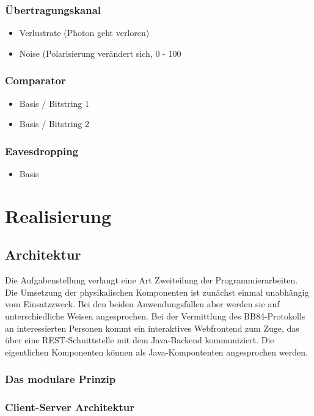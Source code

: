 \documentclass[a4paper,10.2pt,pdftex]{scrartcl}%
\begin{document}
\subsubsection*{ Übertragungskanal}
\begin{itemize}
\item  Verlustrate (Photon geht verloren)
\item  Noise (Polarisierung verändert sich, 0 - 100%
\end{itemize}

\subsubsection*{ Comparator}
\begin{itemize}
\item Basis / Bitstring 1
\item Basis / Bitstring 2
\end{itemize}
\subsubsection*{ Eavesdropping}
\begin{itemize}
\item  Basis
\end{itemize}

\section{Realisierung}
\subsection{Architektur}
Die Aufgabenstellung verlangt eine Art Zweiteilung der Programmierarbeiten. Die Umsetzung der physikalischen Komponenten ist zunächst einmal unabhängig vom Einsatzzweck. Bei den beiden Anwendungsfällen aber werden sie auf unterschiedliche Weisen angesprochen. Bei der Vermittlung des BB84-Protokolls an interessierten Personen kommt ein interaktives Webfrontend zum Zuge, das über eine REST-Schnittstelle mit dem Java-Backend kommuniziert. Die eigentlichen Komponenten können als Java-Kompontenten angesprochen werden. 
\subsubsection{Das modulare Prinzip}  
\subsubsection{Client-Server Architektur}
\end{document}
